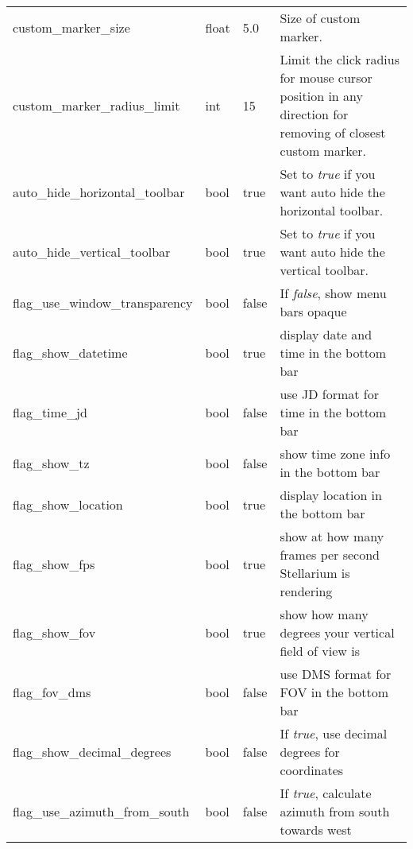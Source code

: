 \begin{longtable}{p{50mm}|l|l|p{55mm}}
custom\_marker\_size             & float   & 5.0 & Size of custom marker.\\%
custom\_marker\_radius\_limit    & int   & 15 & Limit the click radius for mouse cursor position in any direction for removing of closest custom marker.\\\midrule
auto\_hide\_horizontal\_toolbar & bool   & true  & Set to \emph{true} if you want auto hide the horizontal toolbar.\\%
auto\_hide\_vertical\_toolbar   & bool   & true  & Set to \emph{true} if you want auto hide the vertical toolbar.\\%
flag\_use\_window\_transparency & bool   & false & If \emph{false}, show menu bars opaque\\%
flag\_show\_datetime            & bool   & true  & display date and time in the bottom bar\\%
flag\_time\_jd                  & bool   & false & use JD format for time in the bottom bar\\%
flag\_show\_tz                  & bool   & false & show time zone info in the bottom bar\\%
flag\_show\_location            & bool   & true  & display location in the bottom bar\\%
flag\_show\_fps                 & bool   & true  & show at how many frames per second Stellarium is rendering\\%
flag\_show\_fov                 & bool   & true  & show how many degrees your vertical field of view is\\%
flag\_fov\_dms                  & bool   & false & use DMS format for FOV in the bottom bar\\\midrule
%
flag\_show\_decimal\_degrees    & bool   & false & If \emph{true}, use decimal degrees for coordinates\\\midrule
flag\_use\_azimuth\_from\_south & bool   & false & If \emph{true}, calculate azimuth from south towards west 

\end{longtable}

